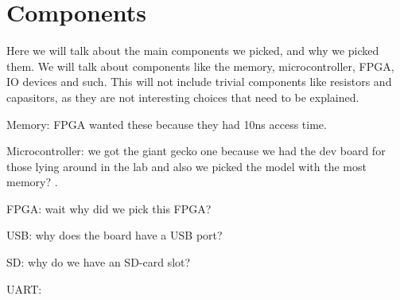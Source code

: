 \section {Components}

Here we will talk about the main components we picked, and why we picked them.
We will talk about components like the memory, microcontroller, FPGA, IO devices and such.
This will not include trivial components like resistors and capasitors, as they are not interesting choices that need to be explained.

Memory: FPGA wanted these because they had 10ns access time.

Microcontroller: we got the giant gecko one because we had the dev board for those lying around in the lab and also we picked the model with the most memory? .

FPGA: wait why did we pick this FPGA? 

USB: why does the board have a USB port? 

SD: why do we have an SD-card slot? 

UART: 

